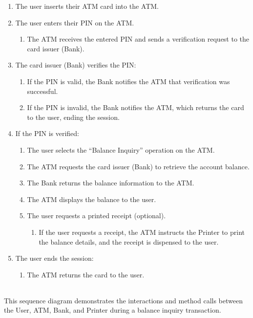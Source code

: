 \begin{enumerate}
\item
\protect{}\label{enrHp1xHLL6VM1Ptn5ljD}
The user inserts their ATM card into the ATM.
\item
\protect{}\label{8NDMh1P89W87NW98vhOWA}
The user enters their PIN on the ATM.

\begin{enumerate}
\item
The ATM receives the entered PIN and sends a verification request to the card issuer (Bank).
\end{enumerate}
\item
\protect{}\label{niW7EHbFnzWg3iPIAAPSH}
The card issuer (Bank) verifies the PIN:

\begin{enumerate}
\item
If the PIN is valid, the Bank notifies the ATM that verification was successful.
\item
If the PIN is invalid, the Bank notifies the ATM, which returns the card to the user, ending the session.
\end{enumerate}
\item
\protect{}\label{Sjne6lv0jYdRiFuJSqOYc}
If the PIN is verified:

\begin{enumerate}
\item
The user selects the ``Balance Inquiry'' operation on the ATM.
\item
The ATM requests the card issuer (Bank) to retrieve the account balance.
\item
The Bank returns the balance information to the ATM.
\item
The ATM displays the balance to the user.
\item
The user requests a printed receipt (optional).

\begin{enumerate}
\item
If the user requests a receipt, the ATM instructs the Printer to print the balance details, and the receipt is dispensed to the user.
\end{enumerate}
\end{enumerate}
\item
\protect{}\label{5wTI9L3J9mtANOD3cCxMH}
The user ends the session:

\begin{enumerate}
\item
The ATM returns the card to the user.
\end{enumerate}
\end{enumerate}
\\
This sequence diagram demonstrates the interactions and method calls between the User, ATM, Bank, and Printer during a balance inquiry transaction.

